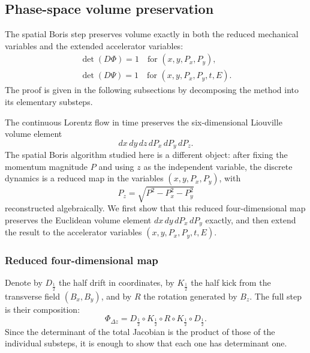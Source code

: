 \subsection{Phase-space volume preservation}
\label{boris:sec:volumepreservation}

The spatial Boris step preserves volume exactly in both the reduced mechanical
variables and the extended accelerator variables:
\[
\boxed{
\begin{gathered}
\det(D\Phi)=1
\quad\text{for } (x,y,P_x,P_y),\\
\det(D\Psi)=1
\quad\text{for } (x,y,P_x,P_y,t,E).
\end{gathered}
}
\]
The proof is given in the following subsections by decomposing the method into
its elementary substeps.

The continuous Lorentz flow in time preserves the six-dimensional Liouville
volume element
\[
dx\,dy\,dz\,dP_x\,dP_y\,dP_z.
\]
The spatial Boris algorithm studied here is a different object: after fixing
the momentum magnitude \(P\) and using \(z\) as the independent variable, the
discrete dynamics is a reduced map in the variables \((x,y,P_x,P_y)\), with
\[
P_z = \sqrt{P^2-P_x^2-P_y^2}
\]
reconstructed algebraically.
We first show that this reduced four-dimensional map preserves the Euclidean
volume element \(dx\,dy\,dP_x\,dP_y\) exactly, and then extend the result to
the accelerator variables \((x,y,P_x,P_y,t,E)\).

\subsubsection{Reduced four-dimensional map}
Denote by \(D_{\frac12}\) the half drift in coordinates, by \(K_{\frac12}\)
the half kick from the transverse field \((B_x,B_y)\), and by \(R\) the
rotation generated by \(B_z\).
The full step is their composition:
\begin{equation}
\label{boris:maps-composition}
\Phi_{\Delta z}
= D_{\frac12}\circ K_{\frac12}\circ R\circ K_{\frac12}\circ D_{\frac12}.
\end{equation}
Since the determinant of the total Jacobian is the product of those of the
individual substeps, it is enough to show that each one has determinant one.

